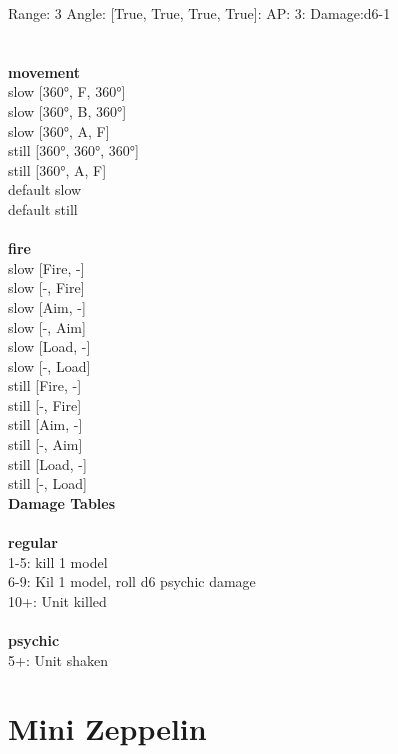 Range: 3  Angle: [True, True, True, True]: AP: 3: Damage:d6-1 \\




 
\ \\




\ \\ {\bf movement } \\
slow [360°, F, 360°] \\
slow [360°, B, 360°] \\
slow [360°, A, F] \\
still [360°, 360°, 360°] \\
still [360°, A, F] \\
default slow \\
default still \\
\ \\ {\bf fire } \\
slow [Fire, -] \\
slow [-, Fire] \\
slow [Aim, -] \\
slow [-, Aim] \\
slow [Load, -] \\
slow [-, Load] \\
still [Fire, -] \\
still [-, Fire] \\
still [Aim, -] \\
still [-, Aim] \\
still [Load, -] \\
still [-, Load] \\


{\bf Damage Tables} \\
\ \\ {\bf regular } \\
1-5: kill 1 model \\
6-9: Kil 1 model, roll d6 psychic damage \\
10+: Unit killed \\
\ \\ {\bf psychic } \\
5+: Unit shaken \\










\pagebreak\pagebreak

\section{ Mini Zeppelin }

